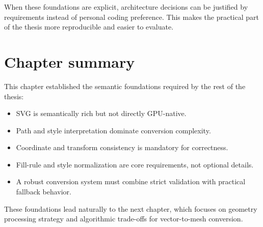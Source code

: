 When these foundations are explicit, architecture decisions can be justified by requirements instead of personal coding preference.
This makes the practical part of the thesis more reproducible and easier to evaluate.

\section{Chapter summary}

This chapter established the semantic foundations required by the rest of the thesis:

\begin{itemize}
\item SVG is semantically rich but not directly GPU-native.
\item Path and style interpretation dominate conversion complexity.
\item Coordinate and transform consistency is mandatory for correctness.
\item Fill-rule and style normalization are core requirements, not optional details.
\item A robust conversion system must combine strict validation with practical fallback behavior.
\end{itemize}

These foundations lead naturally to the next chapter, which focuses on geometry processing strategy and algorithmic trade-offs for vector-to-mesh conversion.

